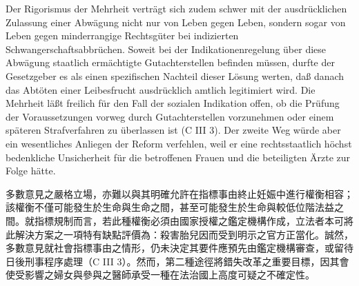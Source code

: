 \documentclass[12pt]{article}
\begin{document}
\syncleft
\begin{sourcepara}
Der Rigorismus der Mehrheit verträgt sich zudem schwer mit der ausdrücklichen Zulassung einer Abwägung nicht nur von Leben gegen Leben, sondern sogar von Leben gegen minderrangige Rechtsgüter bei indizierten Schwangerschaftsabbrüchen. Soweit bei der Indikationenregelung über diese Abwägung staatlich ermächtigte Gutachterstellen befinden müssen, durfte der Gesetzgeber es als einen spezifischen Nachteil dieser Lösung werten, daß danach das Abtöten einer Leibesfrucht ausdrücklich amtlich legitimiert wird. Die Mehrheit läßt freilich für den Fall der sozialen Indikation offen, ob die Prüfung der Voraussetzungen vorweg durch Gutachterstellen vorzunehmen oder einem späteren Strafverfahren zu überlassen ist (C III 3). Der zweite Weg würde aber ein wesentliches Anliegen der Reform verfehlen, weil er eine rechtsstaatlich höchst bedenkliche Unsicherheit für die betroffenen Frauen und die beteiligten Ärzte zur Folge hätte.
\end{sourcepara}
\begin{transpara}
多數意見之嚴格立場，亦難以與其明確允許在指標事由終止妊娠中進行權衡相容；該權衡不僅可能發生於生命與生命之間，甚至可能發生於生命與較低位階法益之間。就指標規制而言，若此種權衡必須由國家授權之鑑定機構作成，立法者本可將此解決方案之一項特有缺點評價為：殺害胎兒因而受到明示之官方正當化。誠然，多數意見就社會指標事由之情形，仍未決定其要件應預先由鑑定機構審查，或留待日後刑事程序處理（C III 3）。然而，第二種途徑將錯失改革之重要目標，因其會使受影響之婦女與參與之醫師承受一種在法治國上高度可疑之不確定性。
\end{transpara}
\end{document}
